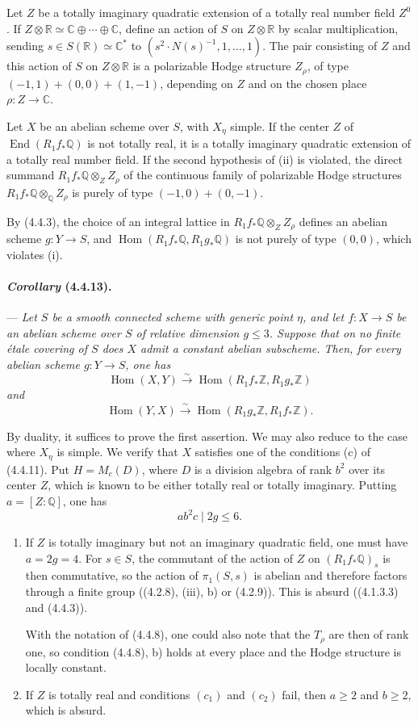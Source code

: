\documentclass[10pt]{article}
\newcommand{\C}{\mathbb C}
\newcommand{\Q}{\mathbb Q}
\newcommand{\Z}{\mathbb Z}
\newcommand{\Hom}{\operatorname{Hom}}
\newcommand{\iso}{\xrightarrow{\sim}}
\newcommand{\R}{\mathbb R}
\providecommand{\End}{\operatorname{End}}
\begin{document}
Let $Z$ be a totally imaginary quadratic extension of a totally real number field $Z^0$. If $Z\otimes\R\simeq \C\oplus\cdots\oplus\C$, define an action of $S$ on $Z\otimes\R$ by scalar multiplication, sending $s\in S(\R)\simeq\C^*$ to $(s^2\cdot N(s)^{-1},1,\ldots,1)$. The pair consisting of $Z$ and this action of $S$ on $Z\otimes\R$ is a polarizable Hodge structure $Z_\rho$, of type $(-1,1)+(0,0)+(1,-1)$, depending on $Z$ and on the chosen place $\rho:Z\to\C$.

Let $X$ be an abelian scheme over $S$, with $X_\eta$ simple. If the center $Z$ of $\End(R_1f_*\Q)$ is not totally real, it is a totally imaginary quadratic extension of a totally real number field. If the second hypothesis of (ii) is violated, the direct summand $R_1f_*\Q\otimes_Z Z_\rho$ of the continuous family of polarizable Hodge structures $R_1f_*\Q\otimes_\Q Z_\rho$ is purely of type $(-1,0)+(0,-1)$.

By (4.4.3), the choice of an integral lattice in $R_1f_*\Q\otimes_Z Z_\rho$ defines an abelian scheme $g:Y\to S$, and $\Hom(R_1f_*\Q,R_1g_*\Q)$ is not purely of type $(0,0)$, which violates (i).

\paragraph{\emph{Corollary} (4.4.13).} --- {\itshape Let $S$ be a smooth connected scheme with generic point $\eta$, and let $f:X\to S$ be an abelian scheme over $S$ of relative dimension $g\le3$. Suppose that on no finite étale covering of $S$ does $X$ admit a constant abelian subscheme. Then, for every abelian scheme $g:Y\to S$, one has
\[
\Hom(X,Y)\iso \Hom(R_1f_*\Z,R_1g_*\Z)
\]
and
\[
\Hom(Y,X)\iso \Hom(R_1g_*\Z,R_1f_*\Z).
\]}

By duality, it suffices to prove the first assertion. We may also reduce to the case where $X_\eta$ is simple. We verify that $X$ satisfies one of the conditions (c) of (4.4.11). Put $H=M_c(D)$, where $D$ is a division algebra of rank $b^2$ over its center $Z$, which is known to be either totally real or totally imaginary. Putting $a=[Z:\Q]$, one has
\[
\tag{4.4.13.1}
ab^2c\mid 2g\le6.
\]


\begin{enumerate}[label=\arabic*)]
\item If $Z$ is totally imaginary but not an imaginary quadratic field, one must have $a=2g=4$. For $s\in S$, the commutant of the action of $Z$ on $(R_1f_*\Q)_s$ is then commutative, so the action of $\pi_1(S,s)$ is abelian and therefore factors through a finite group ((4.2.8), (iii), b) or (4.2.9)). This is absurd ((4.1.3.3) and (4.4.3)).

With the notation of (4.4.8), one could also note that the $T_\rho$ are then of rank one, so condition (4.4.8), b) holds at every place and the Hodge structure is locally constant.

\item If $Z$ is totally real and conditions $(c_1)$ and $(c_2)$ fail, then $a\ge2$ and $b\ge2$, which is absurd.
\end{enumerate}
\end{document}
